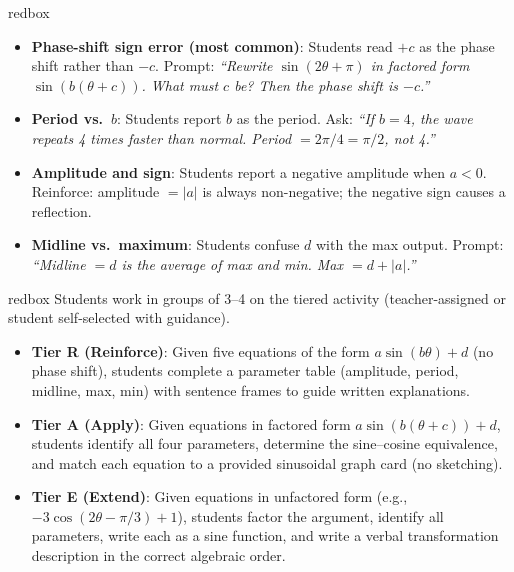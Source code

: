 \documentclass[10pt]{article}
\begin{document}
\vspace{0.08in}

\begin{skillbox}{redbox}
\begin{itemize}[leftmargin=1.4em, itemsep=3pt]
  \item \textbf{Phase-shift sign error (most common)}: Students read $+c$
    as the phase shift rather than $-c$. Prompt: \textit{``Rewrite
    $\sin(2\theta+\pi)$ in factored form $\sin(b(\theta+c))$. What must
    $c$ be? Then the phase shift is $-c$.''}
  \item \textbf{Period vs.\ $b$}: Students report $b$ as the period.
    Ask: \textit{``If $b=4$, the wave repeats 4 times faster than normal.
    Period $=2\pi/4=\pi/2$, not 4.''}
  \item \textbf{Amplitude and sign}: Students report a negative amplitude
    when $a<0$. Reinforce: amplitude $=|a|$ is always non-negative;
    the negative sign causes a reflection.
  \item \textbf{Midline vs.\ maximum}: Students confuse $d$ with the
    max output. Prompt: \textit{``Midline $=d$ is the \emph{average}
    of max and min. Max $= d + |a|$.''}
\end{itemize}
\end{skillbox}

\vspace{0.08in}

\begin{skillbox}{redbox}
Students work in groups of 3--4 on the tiered activity (teacher-assigned
or student self-selected with guidance).

\begin{itemize}[leftmargin=1.4em, itemsep=4pt]
  \item \textbf{Tier R (Reinforce)}: Given five equations of the form
    $a\sin(b\theta)+d$ (no phase shift), students complete a parameter
    table (amplitude, period, midline, max, min) with sentence frames
    to guide written explanations.
  \item \textbf{Tier A (Apply)}: Given equations in factored form
    $a\sin(b(\theta+c))+d$, students identify all four parameters,
    determine the sine--cosine equivalence, and match each equation to
    a provided sinusoidal graph card (no sketching).
  \item \textbf{Tier E (Extend)}: Given equations in unfactored form
    (e.g., $-3\cos(2\theta-\pi/3)+1$), students factor the argument,
    identify all parameters, write each as a sine function, and write
    a verbal transformation description in the correct algebraic order.
\end{itemize}
\end{skillbox}
\end{document}
